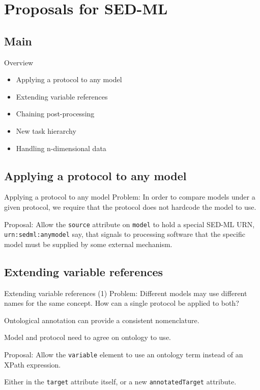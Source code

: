 \documentclass[t,xcolor={usenames,dvipsnames}]{beamer}
\newcommand{\sedml}[1]{\lstinline[basicstyle=\color{blue}]!#1!}
\begin{document}
\section{Proposals for SED-ML}
\subsection*{Main}

\begin{frame}{Overview}
\begin{itemize}
\item Applying a protocol to any model
\item Extending variable references
\item Chaining post-processing
\item New task hierarchy
\item Handling n-dimensional data
\end{itemize}
\end{frame}

\subsection{Applying a protocol to any model}

\begin{frame}{Applying a protocol to any model}
\alert{Problem}:
 In order to compare models under a given protocol, we require that
 the protocol does not hardcode the model to use.

\alert{Proposal}:
 Allow the \sedml{source} attribute on \sedml{model} to hold a special
 SED-ML URN, \sedml{urn:sedml:anymodel} say, that signals to
 processing software that the specific model must be supplied by some
 external mechanism.
\end{frame}

\subsection{Extending variable references}

\begin{frame}{Extending variable references (1)}
\alert{Problem}:
 Different models may use different names for the same concept.  How
 can a single protocol be applied to both?

 \alert{Ontological annotation} can provide a consistent nomenclature.

 Model and protocol need to agree on ontology to use.

\alert{Proposal}:
 Allow the \sedml{variable} element to use an ontology term instead of
 an XPath expression.

 Either in the \sedml{target} attribute itself, or a new
 \sedml{annotatedTarget} attribute.
\end{frame}
\end{document}
